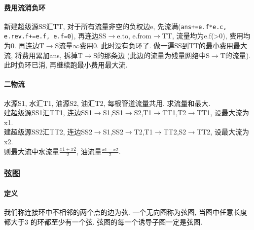 	\paragraph{费用流消负环}
	\par 新建超级源SS汇TT, 对于所有流量非空的负权边e, 先流满(\texttt{ans+=e.f*e.c, e.rev.f+=e.f, e.f=0}), 再连边SS$\to$e.to, e.from$\to$TT, 流量均为e.f(>0), 费用均为0. 再连边T$\to$S流量$\infty$费用0. 此时没有负环了. 做一遍SS到TT的最小费用最大流, 将费用累加ans, 拆掉T$\to$S的那条边 (此边的流量为残量网络中S$\to$T的流量). 此时负环已消, 再继续跑最小费用最大流.
	\paragraph{二物流}
	\par 水源S1, 水汇T1, 油源S2, 油汇T2, 每根管道流量共用. 求流量和最大.\\
	建超级源SS1汇TT1, 连边SS1$\to$S1,SS1$\to$S2,T1$\to$TT1,T2$\to$TT1, 设最大流为x1.\\
	建超级源SS2汇TT2, 连边SS2$\to$S1,SS2$\to$T2,T1$\to$TT2,S2$\to$TT2, 设最大流为x2.\\
	则最大流中水流量$\frac{x1+x2}{2}$, 油流量$\frac{x1-x2}{2}$.
\begin{comment}
\subsubsection{割点于割边}
        \paragraph{割点 割边} 一个点$u$是割点, 当且仅当: 1. $u$为非树根且有树边$(u,v)$满足$dfn_u\leq low_v$; 2. u为树根且有多于一个的子树. 一条无向边$(u,v)$是桥, 当且仅当$(u,v)$是树边, 且满足$dfn_u<low_v$. 

\subsubsection{2-SAT}
    如果选$A$就必须选$B$就从$A$向$B$连一条边, 如果两个只能选一个的条件在同一个强连通分量中就不合法. 输出可行方案可以比较$X$和$X’$的$bl$的大小, 大的选$X’$. 建图优化一般考虑前后缀的合并. 
\end{comment}
\subsubsection{弦图}
				\paragraph{定义}我们称连接环中不相邻的两个点的边为弦. 一个无向图称为弦图, 当图中任意长度都大于$3$ 的环都至少有一个弦. 弦图的每一个诱导子图一定是弦图. 
